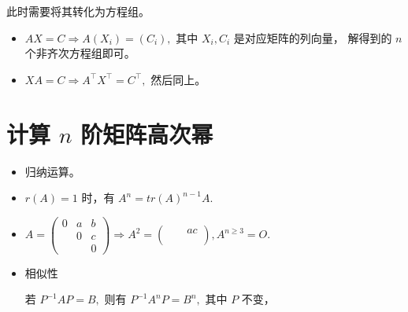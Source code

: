 
此时需要将其转化为方程组。

\begin{itemize}
    \item $ AX = C \Rightarrow A(X_i) = (C_i), $ 其中 $ X_i,C_i $ 是对应矩阵的列向量，
    解得到的 $ n $ 个非齐次方程组即可。
    \item $ XA = C \Rightarrow A^\top X^\top = C^\top, $ 然后同上。
\end{itemize}

\section{计算 $ n $ 阶矩阵高次幂}

\begin{itemize}
    \item 归纳运算。
    \item $ r(A) = 1 $ 时，有 $ A^n = tr(A)^{n-1}A. $ 
    \item $ A = \begin{pmatrix}
        0 & a & b \\ & 0 & c\\ && 0
    \end{pmatrix} \Rightarrow A^2 = \begin{pmatrix}
        &&ac\\ && \\&&
    \end{pmatrix}, A^{n\geq 3} = O.$ 
    \item 相似性
    
    若 $ P^{-1}AP = B, $ 则有 $ P^{-1}A^nP = B^n, $ 其中 $ P $ 不变，
\end{itemize}